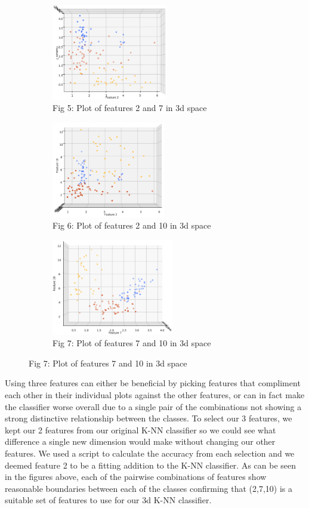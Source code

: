 \documentclass[11pt]{article}
\begin{document}
\begin{figure}[h!]
\captionsetup[subfigure]{labelformat=empty}
\begin{subfigure}{.33\textwidth}
\centering
\includegraphics[height=4.2cm]{3d2x7.png}
\caption{Fig 5: Plot of features 2 and 7 in 3d space}
\end{subfigure}%
\begin{subfigure}{.33\textwidth}
\centering
\includegraphics[height=4.2cm]{3d2x10.png}
\caption{Fig 6: Plot of features 2 and 10 in 3d space}
\end{subfigure}%
\begin{subfigure}{.33\textwidth}
\centering
\includegraphics[height=4.2cm]{3d7x10.png}
\caption{Fig 7: Plot of features 7 and 10 in 3d space}
\end{subfigure}%
\end{figure}

\noindent
Using three features can either be beneficial by picking features that compliment each other in their individual plots against the other features, or can in fact make the classifier worse overall due to a single pair of the combinations not showing a strong distinctive relationship between the classes. To select our 3 features, we kept our 2 features from our original K-NN classifier so we could see what difference a single new dimension would make without changing our other features. We used a script to calculate the accuracy from each selection and we deemed feature 2 to be a fitting addition to the K-NN classifier.  As can be seen in the figures above, each of the pairwise combinations of features show reasonable boundaries between each of the classes confirming that (2,7,10) is a suitable set of features to use for our 3d K-NN classifier. \\
\end{document}
